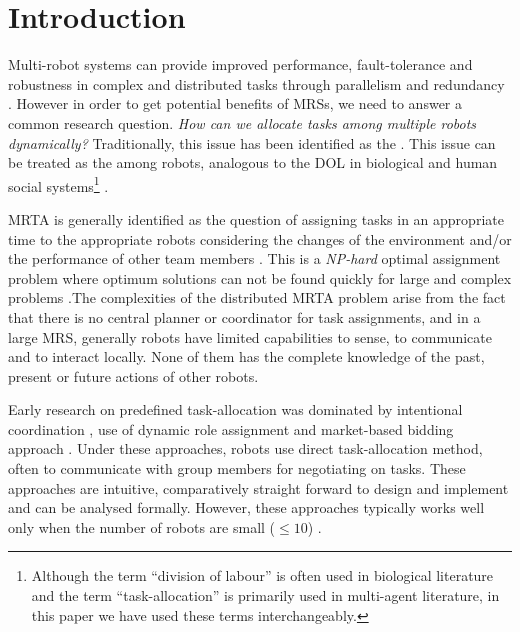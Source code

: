 \documentclass[preprint,12pt]{elsarticle}
\begin{document}
\begin{frontmatter}
\begin{abstract}
\end{abstract}
\end{frontmatter}
\section{Introduction}
\label{sec:intro}
 Multi-robot systems can provide improved performance, fault-tolerance and robustness in complex and distributed tasks through parallelism and redundancy \cite{Arkin1998,Parker+2006}. However in order to get potential benefits of \aclp{MRS}, we need to answer a common research question. \textit{How can we allocate tasks among multiple robots dynamically?} Traditionally, this issue has been identified as the  \cite{Gerkey+2004}. This issue can be treated as the  among robots, analogous to the DOL in biological and human social systems\footnote{Although the term ``division of labour'' is often used in biological literature and the term ``task-allocation'' is primarily used in multi-agent literature,  in this paper we have used these terms interchangeably.} \cite{Sendova-Franks+1999}.

MRTA is generally identified as the question of assigning tasks in an appropriate time to the appropriate robots considering the changes of the environment and/or the performance of other team members \cite{Gerkey+2003}. This is a {\em NP-hard} optimal assignment problem where optimum solutions can not be found quickly for large and complex problems \cite{Parker2008}.The complexities of the distributed MRTA problem arise from the fact that there is no central planner or coordinator for task assignments, and in a large \acl{MRS}, generally robots have limited capabilities to sense, to communicate and to interact locally. None of them has the complete knowledge of the past, present or future actions of other robots.

Early research on predefined task-allocation was dominated by intentional coordination \cite{Parker2008}, use of dynamic role assignment \cite{Chaimowicz2002} and market-based bidding approach \cite{Dias+2006}. Under these approaches, robots use direct task-allocation method, often to communicate with group members for negotiating on tasks. These approaches are intuitive, comparatively straight forward to design and implement and can be analysed formally. However, these approaches typically works well only when the number of robots are small ($\leq 10$) \cite{Lerman+2006}.
\end{document}
